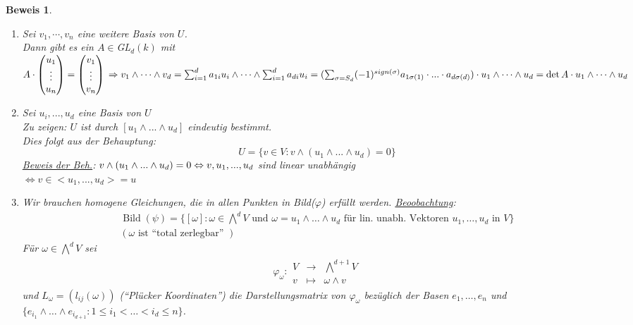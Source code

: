 \documentclass[a4paper,12pt]{report}
\theoremstyle{break}
\theoremstyle{nonumberbreak}
\theoremstyle{nonumberplain}
\newtheorem{Bew}{Beweis}
\newcommand{\Abb}[5]{\ensuremath{#1:\begin{array}{ccc} #2 & \longrightarrow & #3 \\ #4 & \longmapsto & #5 \end{array}}}
\DeclareMathOperator{\Bild}{Bild}
\begin{document}
\begin{Bew}
\begin{enumerate}
\item Sei $v_1,\cdots,v_n$ eine weitere Basis von $U$.\\
Dann gibt es ein $A\in$GL$_d(k)$ mit 
$A\cdot\begin{pmatrix}
u_1\\
\vdots\\
u_n
\end{pmatrix}=
\begin{pmatrix}
v_1\\
\vdots\\
v_n
\end{pmatrix}\\
\Rightarrow v_1\wedge\cdots\wedge v_d=\sum_{i=1}^da_{1i}u_i\wedge\cdots\wedge\sum_{i=1}^da_{di}u_i=\\
(\sum_{\sigma=S_d}(-1)^{sign(\sigma)}a_{1\sigma(1)}\cdot...\cdot a_{d\sigma(d)})\cdot u_1\wedge\cdots\wedge u_d=\det A\cdot u_1\wedge\cdots\wedge u_d$
\item Sei $u_i,...,u_d$ eine Basis von $U$\\
Zu zeigen: $U$ ist durch $[u_1\wedge...\wedge u_d]$ eindeutig bestimmt.\\
Dies folgt aus der Behauptung:
$$U=\{v\in V: v\wedge(u_1\wedge...\wedge u_d)=0\}$$
\underline{Beweis der Beh.}: $v\wedge(u_1\wedge...\wedge u_d)=0\\
\Leftrightarrow v,u_1,...,u_d$ sind linear unabhängig\\
$\Leftrightarrow v\in <u_1,...,u_d>=u$
\item Wir brauchen homogene Gleichungen, die in allen Punkten in Bild($\varphi$) erfüllt werden.
\underline{Beoobachtung}:
  \begin{align*}
  \Bild(\psi)=\{[\omega]:\omega\in\bigwedge^dV\text{ und } \omega=u_1\wedge\dots\wedge u_d
  \text{ für lin. unabh. Vektoren } u_1,\dots, u_d\text{ in } V\} \\
    (\omega \text{ ist ``total zerlegbar'' })
  \end{align*}
  Für $\omega\in \bigwedge^d V$ sei
  \begin{align*}
    \Abb{\varphi_\omega}{V}{\bigwedge^{d+1}V}{v}{\omega\wedge v}
  \end{align*}
  und $L_\omega=(l_{ij}(\omega))$ (``Plücker Koordinaten'') die Darstellungsmatrix von
  $\varphi_\omega$ bezüglich der Basen $e_1,\dots,e_n$ und $\{e_{i_1}\wedge\dots\wedge e_{i_{d+1}}:1\leq i_1<\dots <i_d\leq n\}$.\\

\end{enumerate}
\end{Bew}
\end{document}
